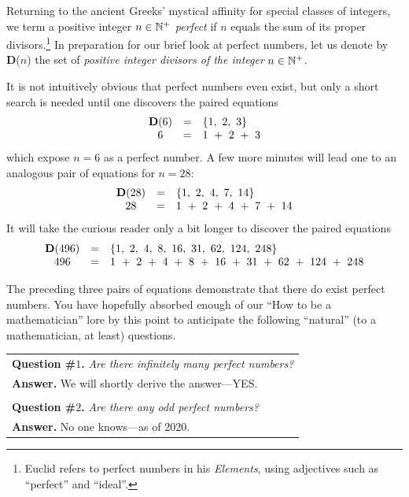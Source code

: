 Returning to the ancient Greeks' mystical affinity for special classes of integers, we term a positive integer $n \in \mathbb{N}^+$ {\it perfect} if $n$ equals the sum of its proper divisors.\footnote{Euclid refers to perfect numbers in his {\it Elements}, using adjectives such as ``perfect'' and ``ideal''.}  In preparation for our brief look at perfect numbers, let us denote by {\bf D}($n$) the set of {\em positive integer divisors of the integer} $n \in \mathbb{N}^+$.

\medskip

It is not intuitively obvious that perfect numbers even exist, but only a short search is needed until one discovers the paired equations
\[ \begin{array}{ccl}
{\bf D}(6) & = & \{ 1, \ 2 , \ 3 \} \\
 6            & = & 1 \ +\ 2 \ + \ 3
\end{array} \]
which expose $n=6$ as a perfect number.  A few more minutes will lead one to an analogous pair of equations for $n=28$:
\[ \begin{array}{ccl}
{\bf D}(28) & = & \{ 1, \ 2, \ 4, \ 7, \ 14\} \\
28              & = &  1 \ + \ 2 \ + \ 4 \ + \ 7\ + \ 14
\end{array} \]
It will take the curious reader only a bit longer to discover the paired equations
\[ \begin{array}{ccl}
{\bf D}(496) & = & \{1, \ 2 , \ 4, \ 8, \ 16, \ 31, \ 62, \ 124, \ 248\} \\
496             & = &  1 \ + \ 2 \ + \ 4 \ + \ 8 \ + \ 16 \ + \ 31 \ + \ 62 \ + \ 124 \ + \ 248
\end{array} \]

\smallskip

The preceding three pairs of equations demonstrate that there do exist perfect numbers.  You have hopefully absorbed enough of our ``How to be a mathematician'' lore by this point to anticipate the following ``natural'' (to a mathematician, at least) questions.

\medskip

\begin{tabular}{l}
{\bf Question \#$1$.}  {\em Are there {\em infinitely many} perfect numbers?} \\
{\bf Answer.}  We will shortly derive the answer---YES. \\
 \\
{\bf Question \#$2$.}  {\em Are there any {\em odd} perfect numbers?} \\
{\bf Answer.}  No one knows---as of 2020.
\end{tabular}

